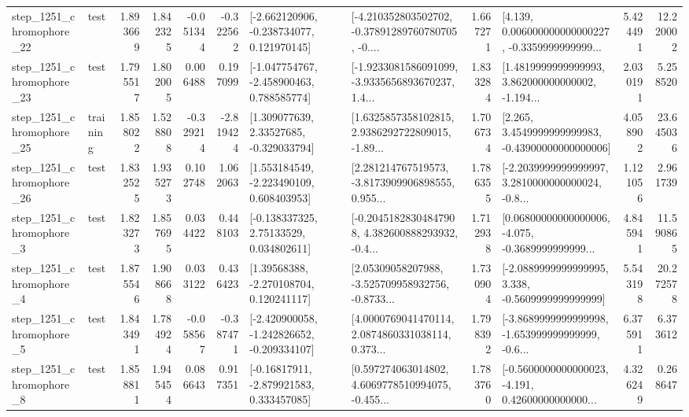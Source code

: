 \begin{tabular}{llrrrrllrlrr}
 step\_1251\_chromophore\_22 &      test &      1.893669 &    1.842325 &     -0.051344 & -0.322562 &   [-2.662120906, -0.238734077, 0.121970145] &  [-4.210352803502702, -0.37891289760780705, -0.... &       1.667271 &  [4.139, 0.006000000000000227, -0.3359999999999... &            5.424491 &         12.220002 \\
 step\_1251\_chromophore\_23 &      test &      1.795517 &    1.802005 &      0.006488 &  0.197099 &   [-1.047754767, -2.458900463, 0.788585774] &  [-1.9233081586091099, -3.9335656893670237, 1.4... &       1.833284 &  [1.4819999999999993, 3.862000000000002, -1.194... &            2.030191 &          5.258520 \\
 step\_1251\_chromophore\_25 &  training &      1.858022 &    1.528808 &     -0.329214 & -2.819424 &     [1.309077639, 2.33527685, -0.329033794] &  [1.6325857358102815, 2.9386292722809015, -1.89... &       1.706734 &  [2.265, 3.4549999999999983, -0.43900000000000006] &            4.058902 &         23.645036 \\
 step\_1251\_chromophore\_26 &      test &      1.832525 &    1.935273 &      0.102748 &  1.062063 &    [1.553184549, -2.223490109, 0.608403953] &  [2.281214767519573, -3.8173909906898555, 0.955... &       1.786355 &  [-2.2039999999999997, 3.2810000000000024, -0.8... &            1.121056 &          2.961739 \\
  step\_1251\_chromophore\_3 &      test &      1.823273 &    1.857695 &      0.034422 &  0.448103 &     [-0.138337325, 2.75133529, 0.034802611] &  [-0.20451828304847908, 4.382600888293932, -0.4... &       1.712938 &  [0.06800000000000006, -4.075, -0.3689999999999... &            4.845941 &         11.590865 \\
  step\_1251\_chromophore\_4 &      test &      1.875546 &    1.908668 &      0.033122 &  0.436423 &     [1.39568388, -2.270108704, 0.120241117] &  [2.05309058207988, -3.525709958932756, -0.8733... &       1.730904 &  [-2.0889999999999995, 3.338, -0.5609999999999999] &            5.543198 &         20.272578 \\
  step\_1251\_chromophore\_5 &      test &      1.843491 &    1.784924 &     -0.058567 & -0.387471 &  [-2.420900058, -1.242826652, -0.209334107] &  [4.0000769041470114, 2.0874860331038114, 0.373... &       1.798392 &  [-3.8689999999999998, -1.653999999999999, -0.6... &            6.375911 &          6.373612 \\
  step\_1251\_chromophore\_8 &      test &      1.858811 &    1.945454 &      0.086643 &  0.917351 &    [-0.16817911, -2.879921583, 0.333457085] &  [0.597274063014802, 4.6069778510994075, -0.455... &       1.783760 &  [-0.5600000000000023, -4.191, 0.42600000000000... &            4.326249 &          0.268647 \\

\end{tabular}
